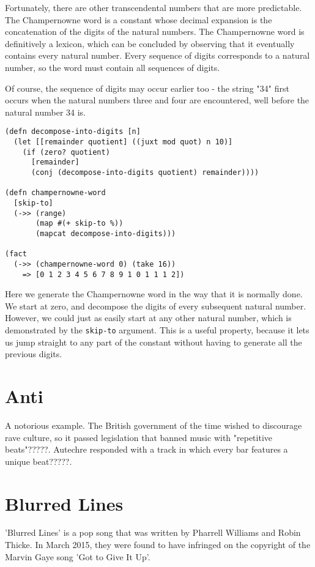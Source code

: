 \documentclass[numbers]{sigplanconf}
\begin{document}
Fortunately, there are other transcendental numbers that are more predictable. The Champernowne word is a constant whose
decimal expansion is the concatenation of the digits of the natural numbers. The Champernowne word is definitively a lexicon,
which can be concluded by observing that it eventually contains every natural number. Every sequence of digits corresponds to
a natural number, so the word must contain all sequences of digits.

Of course, the sequence of digits may occur earlier too - the string "34" first occurs when the natural numbers three and
four are encountered, well before the natural number 34 is.

\begin{verbatim}
(defn decompose-into-digits [n]
  (let [[remainder quotient] ((juxt mod quot) n 10)]
    (if (zero? quotient)
      [remainder]
      (conj (decompose-into-digits quotient) remainder))))

(defn champernowne-word
  [skip-to]
  (->> (range)
       (map #(+ skip-to %))
       (mapcat decompose-into-digits)))

(fact
  (->> (champernowne-word 0) (take 16))
    => [0 1 2 3 4 5 6 7 8 9 1 0 1 1 1 2])
\end{verbatim}

Here we generate the Champernowne word in the way that it is normally done. We start at zero, and decompose the digits of
every subsequent natural number. However, we could just as easily start at any other natural number, which is demonstrated
by the \verb|skip-to| argument. This is a useful property, because it lets us jump straight to any part of the constant
without having to generate all the previous digits.

\section{Anti}

A notorious example. The British government of the time wished to discourage rave culture, so it passed legislation that banned
music with "repetitive beats"?????. Autechre responded with a track in which every bar features a unique beat?????.

\section{Blurred Lines}

'Blurred Lines' is a pop song that was written by Pharrell Williams and Robin Thicke. In March 2015,
they were found to have infringed on the copyright of the Marvin Gaye song 'Got to Give It Up'.
\end{document}
